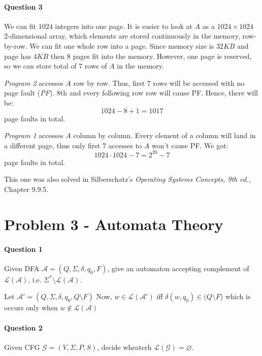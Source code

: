 \paragraph{Question 3}
We can fit $1024$ integers into one page.
It is easier to look at $A$ as a $1024\times 1024$ 2-dimensional array, which elements are stored continuously in the memory, row-by-row.
We can fit one whole row into a page.
Since memory size is $32KB$ and page has $4KB$ then $8$ pages fit into the memory.
However, one page is reserved, so we can store total of $7$ rows of $A$ in the memory.

\emph{Program 2} accesses $A$ row by row.
Thus, first $7$ rows will be accessed with no page fault (\emph{PF}). $8$th and every following row row will cause PF.
Hence, there will be:
\begin{equation*}
    1024-8+1 = 1017
\end{equation*}
page faults in total.

\emph{Program 1} accesses $A$ column by column.
Every element of a column will land in a different page, thus
only first $7$ accesses to $A$ won't cause PF.
We got:
\begin{equation*}
    1024\cdot 1024 - 7 = 2^{20} - 7
\end{equation*}
page faults in total.


This one was also solved in Silberschatz's \textit{Operating Systems Concepts, 9th ed.,} Chapter 9.9.5.


\section{Problem 3 - Automata Theory}

\paragraph{Question 1}
Given DFA $\mathcal{A} = (Q, \Sigma, \delta, q_0, F)$, give an automaton accepting complement of $\mathcal{L(A)}$, i.e. $\Sigma^*\setminus\mathcal{L(A)}$.

Let $\mathcal{A}' = (Q, \Sigma, \delta, q_0, Q\setminus F)$
Now, $w \in \mathcal{L(A')}$ iff $\delta(w, q_0) \in (Q\setminus F$) which is occurs only when $w\notin \mathcal{L(A)}$

\paragraph{Question 2}
Given CFG $\mathcal{G} = (V, \Sigma, P, S)$, decide wheaterh $\mathcal{L(G)} = \varnothing$.

